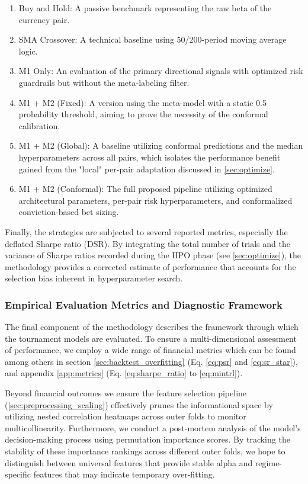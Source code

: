 \documentclass[12pt, a4paper]{article}
\begin{document}
\begin{enumerate}
    \item Buy and Hold: A passive benchmark representing the raw beta of the currency pair.
    \item SMA Crossover: A technical baseline using 50/200-period moving average logic.
    \item M1 Only: An evaluation of the primary directional signals with optimized risk guardrails but without the meta-labeling filter.
    \item M1 + M2 (Fixed): A version using the meta-model with a static 0.5 probability threshold, aiming to prove the necessity of the conformal calibration.
    \item M1 + M2 (Global): A baseline utilizing conformal predictions and the median hyperparameters across all pairs, which isolates the performance benefit gained from the "local" per-pair adaptation discussed in \ref{sec:optimize}.
    \item M1 + M2 (Conformal): The full proposed pipeline utilizing optimized architectural parameters, per-pair risk hyperparameters, and conformalized conviction-based bet sizing.
\end{enumerate}

Finally, the strategies are subjected to several reported metrics, especially the deflated Sharpe ratio (DSR). By integrating the total number of trials and the variance of Sharpe ratios recorded during 
the HPO phase (see \ref{sec:optimize}), the methodology provides a corrected estimate of performance that accounts for the selection bias inherent in hyperparameter search. 


\subsubsection{Empirical Evaluation Metrics and Diagnostic Framework}\label{sec:empirical_framework}

The final component of the methodology describes the framework through which the tournament models are evaluated. 
To ensure a multi-dimensional assessment of performance, we employ a wide range of financial metrics which can be found among others in section \ref{sec:backtest_overfitting} 
(Eq. \ref{eq:psr} and \ref{eq:sr_star}), and appendix \ref{app:metrics} (Eq. \ref{eq:sharpe_ratio} to \ref{eq:mintrl}).

\medskip

Beyond financial outcomes we ensure the feature selection pipeline (\ref{sec:preprocessing_scaling}) effectively prunes the informational space by utilizing nested correlation heatmaps 
across outer folds to monitor multicollinearity. Furthermore, we conduct a post-mortem analysis of the model's decision-making process using permutation importance scores. 
By tracking the stability of these importance rankings across different outer folds, we hope to distinguish between universal features that provide stable alpha and 
regime-specific features that may indicate temporary over-fitting.
\end{document}
